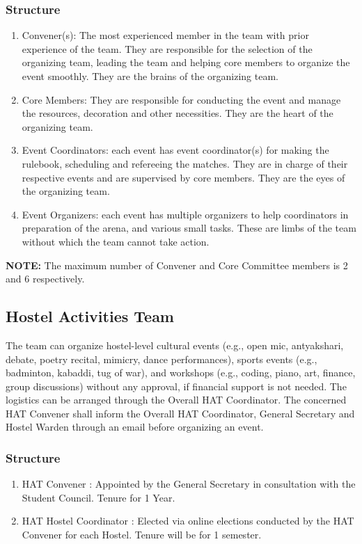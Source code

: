 \documentclass[12pt]{article}
\begin{document}
\subsubsection{Structure}
\begin{enumerate}
    \item Convener(s): The most experienced member in the team with prior experience of the team.  They are responsible for the selection of the organizing team, leading the team and helping core members to organize the event smoothly. They are the brains of the organizing team.
    \item Core Members: They are responsible for conducting the event and manage the resources, decoration and other necessities. They are the heart of the organizing team.
    \item Event Coordinators: each event has event coordinator(s) for making the rulebook, scheduling and refereeing the matches. They are in charge of their respective events and are supervised by core members. They are the eyes of the organizing team. 
    \item Event Organizers: each event has multiple organizers to help coordinators in preparation of the arena, and various small tasks. These are limbs of the team without which the team cannot take action.
\end{enumerate}
\textbf{NOTE:} The  maximum  number  of  Convener  and  Core  Committee  members  is  2  and  6 respectively.

\subsection{Hostel Activities Team}
The team can organize hostel-level cultural events (e.g., open mic, antyakshari,
debate, poetry recital, mimicry, dance performances), sports events (e.g., badminton,
kabaddi, tug of war), and workshops (e.g., coding, piano, art, finance, group
discussions) without any approval, if financial support is not needed. The logistics
can be arranged through the Overall HAT Coordinator. The concerned HAT
Convener shall inform the Overall HAT Coordinator, General Secretary and Hostel
Warden through an email before organizing an event.
\subsubsection{Structure}
\begin{enumerate}
    \item HAT Convener : Appointed by the General Secretary in consultation with the Student Council. Tenure for 1 Year.
    \item HAT Hostel Coordinator : Elected via online elections conducted by the HAT Convener for each Hostel. Tenure will be for 1 semester.
\end{enumerate}
\end{document}

